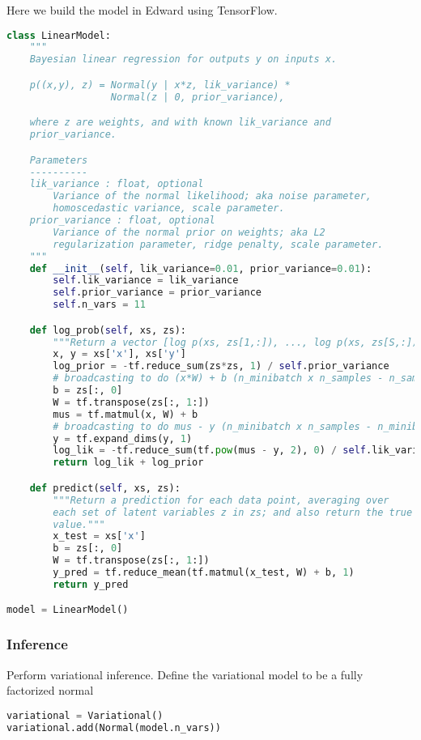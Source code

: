 Here we build the model in Edward using TensorFlow.
\begin{lstlisting}[language=Python]
class LinearModel:
    """
    Bayesian linear regression for outputs y on inputs x.

    p((x,y), z) = Normal(y | x*z, lik_variance) *
                  Normal(z | 0, prior_variance),

    where z are weights, and with known lik_variance and
    prior_variance.

    Parameters
    ----------
    lik_variance : float, optional
        Variance of the normal likelihood; aka noise parameter,
        homoscedastic variance, scale parameter.
    prior_variance : float, optional
        Variance of the normal prior on weights; aka L2
        regularization parameter, ridge penalty, scale parameter.
    """
    def __init__(self, lik_variance=0.01, prior_variance=0.01):
        self.lik_variance = lik_variance
        self.prior_variance = prior_variance
        self.n_vars = 11

    def log_prob(self, xs, zs):
        """Return a vector [log p(xs, zs[1,:]), ..., log p(xs, zs[S,:])]."""
        x, y = xs['x'], xs['y']
        log_prior = -tf.reduce_sum(zs*zs, 1) / self.prior_variance
        # broadcasting to do (x*W) + b (n_minibatch x n_samples - n_samples)
        b = zs[:, 0]
        W = tf.transpose(zs[:, 1:])
        mus = tf.matmul(x, W) + b
        # broadcasting to do mus - y (n_minibatch x n_samples - n_minibatch x 1)
        y = tf.expand_dims(y, 1)
        log_lik = -tf.reduce_sum(tf.pow(mus - y, 2), 0) / self.lik_variance
        return log_lik + log_prior

    def predict(self, xs, zs):
        """Return a prediction for each data point, averaging over
        each set of latent variables z in zs; and also return the true
        value."""
        x_test = xs['x']
        b = zs[:, 0]
        W = tf.transpose(zs[:, 1:])
        y_pred = tf.reduce_mean(tf.matmul(x_test, W) + b, 1)
        return y_pred

model = LinearModel()
\end{lstlisting}


\subsubsection{Inference}

Perform variational inference.
Define the variational model to be a fully factorized normal
\begin{lstlisting}[language=Python]
variational = Variational()
variational.add(Normal(model.n_vars))
\end{lstlisting}

